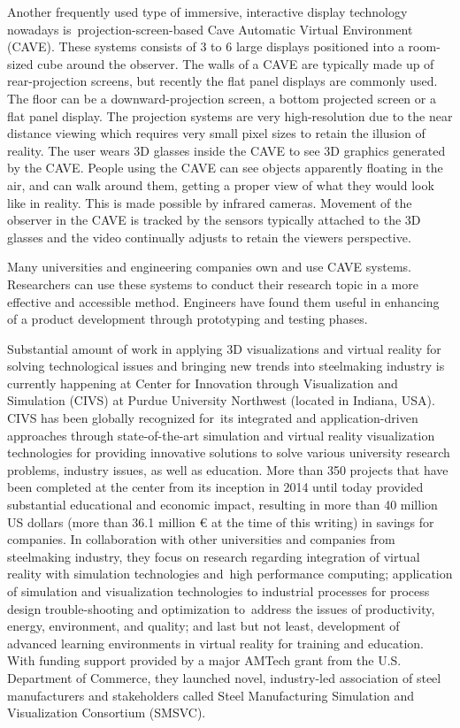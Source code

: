 Another frequently used type of immersive, interactive display technology nowadays is~projection-screen-based Cave Automatic Virtual Environment (CAVE). These systems consists of 3 to 6 large displays positioned into a room-sized cube around the observer. The walls of a CAVE are typically made up of rear-projection screens, but recently the flat panel displays are commonly used. The floor can be a downward-projection screen, a bottom projected screen or a flat panel display. The projection systems are very high-resolution due to the near distance viewing which requires very small pixel sizes to retain the illusion of reality. The user wears 3D glasses inside the CAVE to see 3D graphics generated by the CAVE. People using the CAVE can see objects apparently floating in the air, and can walk around them, getting a proper view of what they would look like in reality. This is made possible by infrared cameras. Movement of the observer in the CAVE is tracked by the sensors typically attached to the 3D glasses and the video continually adjusts to retain the viewers perspective.

Many universities and engineering companies own and use CAVE systems. Researchers can use these systems to conduct their research topic in a more effective and accessible method. Engineers have found them useful in enhancing of a product development through prototyping and testing phases.

Substantial amount of work in applying 3D visualizations and virtual reality for solving technological issues and bringing new trends into steelmaking industry is currently happening at Center for Innovation through Visualization and Simulation (CIVS) at Purdue University Northwest (located in Indiana, USA). CIVS has been globally recognized for~its integrated and application-driven approaches through state-of-the-art simulation and virtual reality visualization technologies for providing innovative solutions to solve various university research problems, industry issues, as well as education. More than 350 projects that have been completed at the center from its inception in 2014 until today provided substantial educational and economic impact, resulting in more than 40 million US dollars (more than 36.1 million € at the time of this writing) in savings for companies. In collaboration with other universities and companies from steelmaking industry, they focus on research regarding integration of virtual reality with simulation technologies and~high performance computing; application of simulation and visualization technologies to industrial processes for process design trouble-shooting and optimization to~address the issues of productivity, energy, environment, and quality; and last but not least, development of advanced learning environments in virtual reality for training and education. With funding support provided by a major AMTech grant from the U.S. Department of Commerce, they launched novel, industry-led association of steel manufacturers and stakeholders called Steel Manufacturing Simulation and Visualization Consortium (SMSVC).

